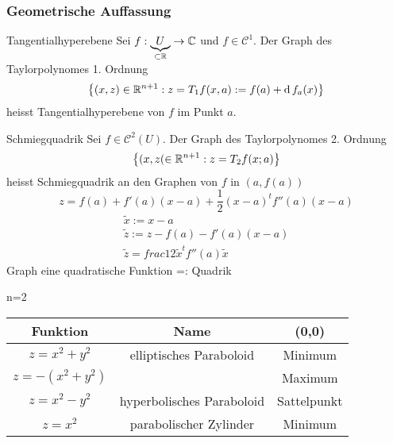 \subsubsection{Geometrische Auffassung}
\begin{Def}{Tangentialhyperebene}
  Sei $f:\underbrace{U}_{\subset\mathbb{R}}\to \mathbb{C}$ und $f\in\mathcal{C}^1$. Der Graph des Taylorpolynomes 1. Ordnung
  \[\left\{ (x,z)\in\mathbb{R}^{n+1}:z=T_1f(x,a):=f(a)+\operatorname{d} f_a(x) \right\}\]
  heisst Tangentialhyperebene von $f$ im Punkt $a$.
\end{Def}
\begin{Def}{Schmiegquadrik}
  Sei $f\in\mathcal{C}^2(U)$. Der Graph des Taylorpolynomes 2. Ordnung
  \[\left\{ (x,z(\in\mathbb{R}^{n+1}:z=T_2f(x;a) \right\}\]
  heisst Schmiegquadrik an den Graphen von $f$ in $\left( a,f(a) \right)$
  \[z=f(a)+f'(a)(x-a)+\frac{1}{2}(x-a)^tf''(a)(x-a)\]
  \begin{gather*}
    \tilde x:=x-a\\
    \tilde z:=z-f(a)-f'(a)(x-a)\\
    \tilde z=frac{1}{2}\tilde x^tf''(a)\tilde x
  \end{gather*}
  Graph eine quadratische Funktion =: Quadrik
\end{Def}
\begin{Bsp}
  n=2
  \begin{table}
    \centering
    \begin{tabular}{c|c|c}
      Funktion&Name&(0,0)\\
      \hline
      $z=x^2+y^2$& elliptisches Paraboloid&Minimum\\
      $z=-(x^2+y^2)$&&Maximum\\
      \hline
      $z=x^2-y^2$&hyperbolisches Paraboloid&Sattelpunkt\\
      \hline
      $z=x^2$&parabolischer Zylinder&Minimum
      
    \end{tabular}
  \end{table}
\end{Bsp}
